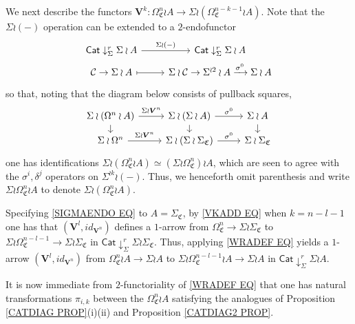 \documentclass[a4paper,10pt
,draft
]{article}%
\numberwithin{equation}{section}
\numberwithin{figure}{section}
\theoremstyle{definition} %
\newcommand{\1}{\ensuremath{\mathbbm 1}}%
\begin{document}
We next describe the functors
$\boldsymbol{V}^k \colon \Omega^n_{\mathfrak{C}} \wr A
\to 
\Sigma \wr \left(\Omega^{n-k-1}_{\mathfrak{C}} \wr A \right)$.
Note that the $\Sigma \wr (-)$ operation can be extended to a $2$-endofunctor
\begin{equation}\label{SIGMAENDO EQ}
\begin{tikzcd}[row sep = 0pt]
\mathsf{Cat} \downarrow^r_{\Sigma} \Sigma \wr A \ar{r}{\Sigma \wr (-)} &
\mathsf{Cat} \downarrow^r_{\Sigma} \Sigma \wr A
\\
\mathcal{C} \to \Sigma \wr A \ar[mapsto]{r} &
\Sigma \wr \mathcal{C} \to \Sigma^{\wr 2} \wr A \xrightarrow{\sigma^{0}} \Sigma \wr A 
\end{tikzcd}
\end{equation}
so that, noting that the diagram below consists of pullback squares,
\begin{equation}
\begin{tikzcd}[row sep = 8pt]
\Sigma \wr (\Omega^n \wr A) \ar{r}{\Sigma \wr \boldsymbol{V}^n} \ar{d} &
\Sigma \wr (\Sigma \wr A) \ar{d} \ar{r}{\sigma^0} &
\Sigma \wr A  \ar{d}
\\
\Sigma \wr \Omega^n \ar{r}{\Sigma \wr \boldsymbol{V}^n} &
\Sigma \wr (\Sigma \wr \Sigma_{\mathfrak{C}}) \ar{r}{\sigma^0} &
\Sigma \wr \Sigma_{\mathfrak{C}}
\end{tikzcd}
\end{equation}
one has identifications
$\Sigma \wr \left(\Omega^{n}_{\mathfrak{C}} \wr A \right)
\simeq 
\left(\Sigma \wr \Omega^{n}_{\mathfrak{C}}\right) \wr A $,
which are seen to agree with the $\sigma^i,\delta^j$ operators on $\Sigma^{\wr k} \wr (-)$.
Thus, we henceforth omit parenthesis and write 
$\Sigma \wr \Omega^{n}_{\mathfrak{C}} \wr A$
to denote 
$\Sigma \wr \left(\Omega^{n}_{\mathfrak{C}} \wr A \right)$.

Specifying \eqref{SIGMAENDO EQ} to $A = \Sigma_{\mathfrak{C}}$,
by \eqref{VKADD EQ} when $k=n-l-1$ one has that
$(\boldsymbol{V}^l,id_{\boldsymbol{V}^{n}})$
defines a $1$-arrow from 
$\Omega^n_{\mathfrak{C}} \to \Sigma \wr \Sigma_{\mathfrak{C}}$
to 
$\Sigma \wr \Omega^{n-l-1}_{\mathfrak{C}} \to \Sigma \wr \Sigma_{\mathfrak{C}}$
in
$\mathsf{Cat} \downarrow^r_{\Sigma} \Sigma \wr \Sigma_{\mathfrak{C}}$. 
Thus, applying \eqref{WRADEF EQ} yields a $1$-arrow
$(\boldsymbol{V}^l,id_{\boldsymbol{V}^{n}})$
from
$\Omega^n_{\mathfrak{C}}\wr A \to \Sigma \wr A$
to 
$\Sigma \wr \Omega^{n-l-1}_{\mathfrak{C}} \wr A \to \Sigma \wr A$
in
$\mathsf{Cat} \downarrow^r_{\Sigma} \Sigma \wr A$.

It is now immediate from $2$-functoriality of
\eqref{WRADEF EQ}
that one has natural transformations $\pi_{i,k}$
between the $\Omega^n_{\mathfrak{C}}\wr A$
satisfying the analogues of 
Proposition \ref{CATDIAG PROP}(i)(ii) and Proposition \ref{CATDIAG2 PROP}.
\end{document}
